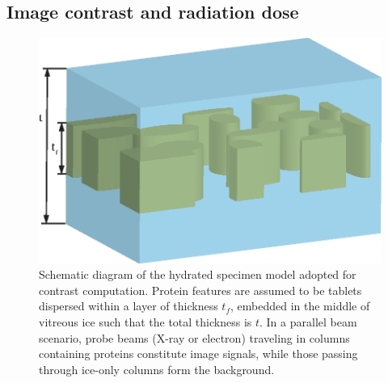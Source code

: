 \documentclass[review]{elsarticle}
\begin{document}
\subsection{Image contrast and radiation dose}

\begin{figure}[htbp]
\begin{center}
\includegraphics{contrast_scheme.eps}
\caption{Schematic diagram of the hydrated specimen model adopted for contrast computation. Protein features are assumed to be tablets dispersed within a layer of thickness $t_f$, embedded in the middle of vitreous ice such that the total thickness is $t$. In a parallel beam scenario, probe beams (X-ray or electron) traveling in columns containing proteins constitute image signals, while those passing through ice-only columns form the background. }
\label{fig:contrast_scheme}
\end{center}
\end{figure}
\end{document}
